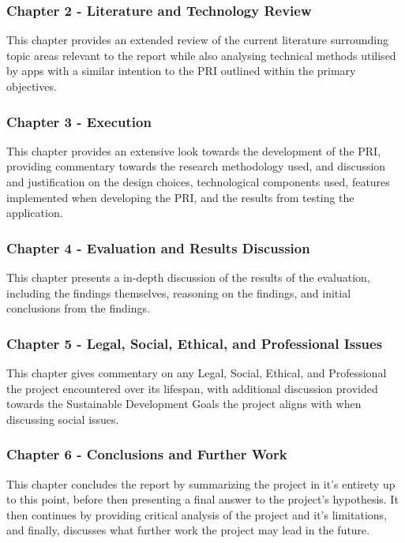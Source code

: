 \documentclass[12pt]{article}
\begin{document}
\subsubsection{Chapter 2 - Literature and Technology Review}
This chapter provides an extended review of the current literature surrounding topic areas relevant to the report while also
analysing technical methods utilised by apps with a similar intention to the PRI outlined within the primary objectives. \newline

\subsubsection{Chapter 3 - Execution}
This chapter provides an extensive look towards the development of the PRI, providing commentary towards the research methodology
used, and discussion and justification on the design choices, technological components used, features implemented when developing the PRI, and
the results from testing the application. \newline

\subsubsection{Chapter 4 - Evaluation and Results Discussion}
This chapter presents a in-depth discussion of the results of the evaluation, including the findings themselves, reasoning on the 
findings, and initial conclusions from the findings. \newline


\subsubsection{Chapter 5 - Legal, Social, Ethical, and Professional Issues}
This chapter gives commentary on any Legal, Social, Ethical, and Professional the project encountered over its lifespan, with
additional discussion provided towards the Sustainable Development Goals the project aligns with when discussing social issues. \newline


\subsubsection{Chapter 6 - Conclusions and Further Work}
This chapter concludes the report by summarizing the project in it's entirety up to this point, before then presenting a final answer 
to the project's hypothesis. It then continues by providing critical analysis of the project and it's limitations, and finally, discusses 
what further work the project may lead in the future.
\end{document}
